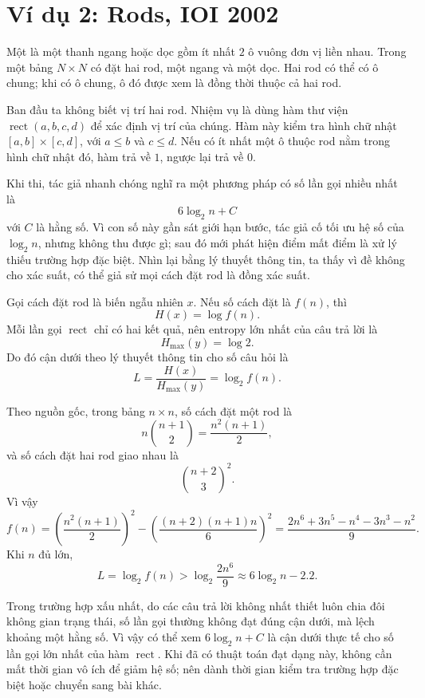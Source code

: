 \documentclass[11pt]{article}
\begin{document}
\section{Ví dụ 2: Rods, IOI 2002}

Một  là một thanh ngang hoặc dọc gồm ít nhất \(2\) ô vuông đơn vị
liền nhau. Trong một bảng \(N\times N\) có đặt hai rod, một ngang và một dọc.
Hai rod có thể có ô chung; khi có ô chung, ô đó được xem là đồng thời thuộc
cả hai rod.

Ban đầu ta không biết vị trí hai rod. Nhiệm vụ là dùng hàm thư viện
\(\operatorname{rect}(a,b,c,d)\) để xác định vị trí của chúng. Hàm này kiểm
tra hình chữ nhật \([a,b]\times[c,d]\), với \(a\le b\) và \(c\le d\). Nếu có
ít nhất một ô thuộc rod nằm trong hình chữ nhật đó, hàm trả về \(1\), ngược
lại trả về \(0\).

Khi thi, tác giả nhanh chóng nghĩ ra một phương pháp có số lần gọi nhiều nhất
là
\[
  6\log_2 n + C
\]
với \(C\) là hằng số. Vì con số này gần sát giới hạn bước, tác giả cố tối ưu
hệ số của \(\log_2 n\), nhưng không thu được gì; sau đó mới phát hiện điểm mất
điểm là xử lý thiếu trường hợp đặc biệt. Nhìn lại bằng lý thuyết thông tin,
ta thấy vì đề không cho xác suất, có thể giả sử mọi cách đặt rod là đồng xác
suất.

Gọi cách đặt rod là biến ngẫu nhiên \(x\). Nếu số cách đặt là \(f(n)\), thì
\[
  H(x)=\log f(n).
\]
Mỗi lần gọi \(\operatorname{rect}\) chỉ có hai kết quả, nên entropy lớn nhất
của câu trả lời là
\[
  H_{\max}(y)=\log 2.
\]
Do đó cận dưới theo lý thuyết thông tin cho số câu hỏi là
\[
  L=\frac{H(x)}{H_{\max}(y)}=\log_2 f(n).
\]

Theo nguồn gốc, trong bảng \(n\times n\), số cách đặt một rod là
\[
  n\binom{n+1}{2}=\frac{n^2(n+1)}2,
\]
và số cách đặt hai rod giao nhau là
\[
  \binom{n+2}{3}^2.
\]
Vì vậy
\[
  f(n)=
  \left(\frac{n^2(n+1)}2\right)^2
  -
  \left(\frac{(n+2)(n+1)n}{6}\right)^2
  =
  \frac{2n^6+3n^5-n^4-3n^3-n^2}{9}.
\]
Khi \(n\) đủ lớn,
\[
  L=\log_2 f(n)>\log_2\frac{2n^6}{9}
  \approx 6\log_2 n-2.2.
\]

Trong trường hợp xấu nhất, do các câu trả lời không nhất thiết luôn chia đôi
không gian trạng thái, số lần gọi thường không đạt đúng cận dưới, mà lệch
khoảng một hằng số. Vì vậy có thể xem \(6\log_2 n+C\) là cận dưới thực tế cho
số lần gọi lớn nhất của hàm \(\operatorname{rect}\). Khi đã có thuật toán đạt
dạng này, không cần mất thời gian vô ích để giảm hệ số; nên dành thời gian
kiểm tra trường hợp đặc biệt hoặc chuyển sang bài khác.
\end{document}
